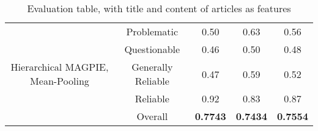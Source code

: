 \begin{table}[htbp]
\begin{tabular}{| c | c | c | c | c |}
        \multirow{5}{*}{Hierarchical MAGPIE, Mean-Pooling} & Problematic        & 0.50               & 0.63            & 0.56            \\
                                                           & Questionable       & 0.46               & 0.50            & 0.48            \\
                                                           & Generally Reliable & 0.47               & 0.59            & 0.52            \\
                                                           & Reliable           & 0.92               & 0.83            & 0.87            \\\cline{2-5}
                                                           & Overall            & \textbf{0.7743}    & \textbf{0.7434} & \textbf{0.7554} \\
        \hline
    \end{tabular}
    \caption{Evaluation table, with title and content of articles as features}
    \label{table:eval}
\end{table}

